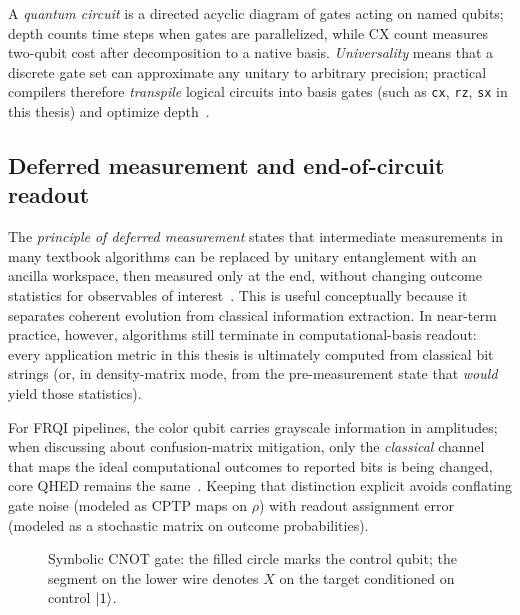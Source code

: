 A \emph{quantum circuit} is a directed acyclic diagram of gates acting on named qubits; depth counts time steps when gates are parallelized, while CX count measures two-qubit cost after decomposition to a native basis. \emph{Universality} means that a discrete gate set can approximate any unitary to arbitrary precision; practical compilers therefore \emph{transpile} logical circuits into basis gates (such as \texttt{cx}, \texttt{rz}, \texttt{sx} in this thesis) and optimize depth~\cite{NielsenChuang2010}.

\subsection{Deferred measurement and end-of-circuit readout}
The \emph{principle of deferred measurement} states that intermediate measurements in many textbook algorithms can be replaced by unitary entanglement with an ancilla workspace, then measured only at the end, without changing outcome statistics for observables of interest~\cite{NielsenChuang2010}. This is useful conceptually because it separates coherent evolution from classical information extraction. In near-term practice, however, algorithms still terminate in computational-basis readout: every application metric in this thesis is ultimately computed from classical bit strings (or, in density-matrix mode, from the pre-measurement state that \emph{would} yield those statistics).

For FRQI pipelines, the color qubit carries grayscale information in amplitudes; when discussing about confusion-matrix mitigation, only the \emph{classical} channel that maps the ideal computational outcomes to reported bits is being changed, core QHED remains the same~\cite{Mu2025GuidedImageFiltering}. Keeping that distinction explicit avoids conflating gate noise (modeled as CPTP maps on $\rho$) with readout assignment error (modeled as a stochastic matrix on outcome probabilities).

\begin{figure}[htbp]
\centering
{}
\caption{Symbolic CNOT gate: the filled circle marks the control qubit; the segment on the lower wire denotes $X$ on the target conditioned on control $\ket{1}$.}
\label{fig:tikz-cnot}
\end{figure}

